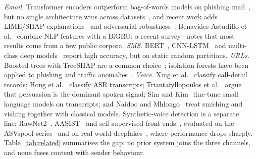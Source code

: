 \documentclass[conference]{IEEEtran}
\begin{document}
\textit{Email.} Transformer encoders outperform bag-of-words models on phishing
mail~\cite{uddin2024explainable}, but no single architecture wins across
datasets~\cite{altwaijry2024advancing,alhuzali2025indepth}, and recent work adds
LIME/SHAP explanations~\cite{roshinta2026temporal,calzarossa2024explainable}
and adversarial robustness~\cite{sup2025explainable,kulkarni2024ml2llm}.
Benavides-Astudillo et al.~\cite{benavides2023phishing} combine NLP features with a
BiGRU; a recent survey~\cite{ahmad2025spectrum} notes that most results come from
a few public corpora. \textit{SMS.} BERT~\cite{jain2025smishing},
CNN-LSTM~\cite{mehmood2024smishing} and multi-class deep
models~\cite{boulahaia2025multiclass} report high accuracy, but on static random
partitions. \textit{URLs.} Boosted trees with TreeSHAP are a common
choice~\cite{uddin2025boosting}; isolation forests have been applied to
phishing and traffic anomalies~\cite{lestari2025isolation,chua2024isolation}.
\textit{Voice.} Xing et al.~\cite{xing2020fraudcall} classify call-detail
records; Hong et al.~\cite{hong2023scamcalls} classify ASR transcripts;
Triantafyllopoulos et al.~\cite{triantafyllopoulos2025vishing} argue that
persuasion is the dominant spoken signal; Sim and Kim~\cite{sim2025slm} fine-tune
small language models on transcripts; and Naidoo and
Mhlongo~\cite{naidoo2024smishvish} treat smishing and vishing together with
classical models. Synthetic-voice detection is a separate line:
RawNet2~\cite{tak2021rawnet2}, AASIST~\cite{jung2022aasist} and
self-supervised front ends~\cite{tak2022ssl}, evaluated on the ASVspoof
series~\cite{wang2020asvspoof2019,liu2023asvspoof2021,wang2024asvspoof5} and on
real-world deepfakes~\cite{muller2022itw}, where performance drops sharply.
Table~\ref{tab:related} summarises the gap: no prior system joins the three
channels, and none fuses content with sender behaviour.
\end{document}

